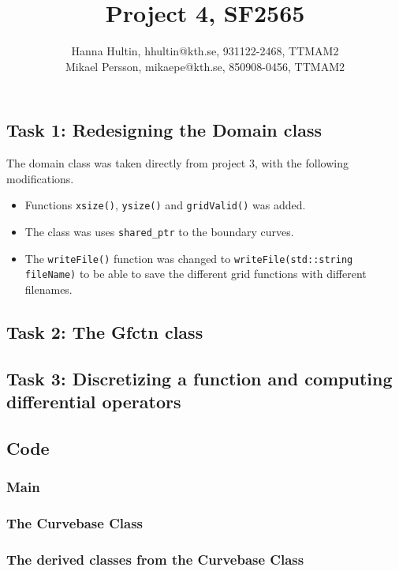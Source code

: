 \documentclass[a4paper,10pt]{article}
\title{Project 4, SF2565}
\author{Hanna Hultin, hhultin@kth.se, 931122-2468, TTMAM2 \\ Mikael Persson, mikaepe@kth.se, 850908-0456, TTMAM2}
\begin{document}
\maketitle

\subsection*{Task 1: Redesigning the Domain class}
The domain class was taken directly from project 3, with the following modifications. 
\begin{itemize}
  \item
    Functions \texttt{xsize()}, \texttt{ysize()} and \texttt{gridValid()} was added.
  \item The class was uses \texttt{shared\_ptr} to the boundary curves. 
  \item
    The \texttt{writeFile()} function was changed to 
    \texttt{writeFile(std::string fileName)} to be able to save the 
    different grid functions with different filenames.
\end{itemize}

\subsection*{Task 2: The Gfctn class}


\subsection*{Task 3: Discretizing a function and computing differential operators}


\newpage
\subsection*{Code}
\subsubsection*{Main}

\subsubsection*{The Curvebase Class}


\subsubsection*{The derived classes from the Curvebase Class}






\end{document}
